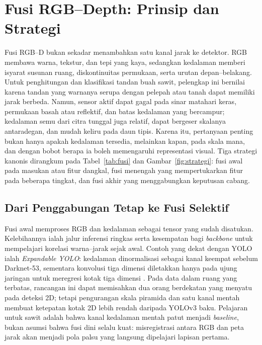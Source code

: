 
\section{Fusi RGB--Depth: Prinsip dan Strategi}\label{sec:fusi}
Fusi RGB--D bukan sekadar menambahkan satu kanal jarak ke detektor. RGB
membawa warna, tekstur, dan tepi yang kaya, sedangkan kedalaman memberi
isyarat susunan ruang, diskontinuitas permukaan, serta urutan depan--belakang.
Untuk penghitungan dan klasifikasi tandan buah sawit, pelengkap ini bernilai
karena tandan yang warnanya serupa dengan pelepah atau tanah dapat memiliki
jarak berbeda. Namun, sensor aktif dapat gagal pada sinar matahari keras,
permukaan basah atau reflektif, dan batas kedalaman yang bercampur; kedalaman
semu dari citra tunggal juga relatif, dapat bergeser skalanya antaradegan, dan
mudah keliru pada daun tipis. Karena itu, pertanyaan penting bukan hanya
apakah kedalaman tersedia, melainkan kapan, pada skala mana, dan dengan bobot
berapa ia boleh memengaruhi representasi visual. Tiga strategi kanonis
dirangkum pada Tabel~\ref{tab:fusi} dan Gambar~\ref{fig:strategi}: fusi awal
pada masukan atau fitur dangkal, fusi menengah yang mempertukarkan fitur pada
beberapa tingkat, dan fusi akhir yang menggabungkan keputusan cabang.

\subsection{Dari Penggabungan Tetap ke Fusi Selektif}

Fusi awal memproses RGB dan kedalaman sebagai tensor yang sudah disatukan.
Kelebihannya ialah jalur inferensi ringkas serta kesempatan bagi \textit{backbone}
untuk mempelajari korelasi warna--jarak sejak awal. Contoh yang dekat dengan
YOLO ialah \textit{Expandable YOLO}: kedalaman dinormalisasi sebagai kanal
keempat sebelum Darknet-53, sementara konvolusi tiga dimensi diletakkan hanya
pada ujung jaringan untuk meregresi kotak tiga dimensi \cite{takahashi2020expandableyolo}.
Pada data dalam ruang yang terbatas, rancangan ini dapat memisahkan dua orang
berdekatan yang menyatu pada deteksi 2D; tetapi pengurangan skala piramida dan
satu kanal mentah membuat ketepatan kotak 2D lebih rendah daripada YOLOv3
baku. Pelajaran untuk sawit adalah bahwa kanal kedalaman mentah patut menjadi
\textit{baseline}, bukan asumsi bahwa fusi dini selalu kuat: misregistrasi
antara RGB dan peta jarak akan menjadi pola palsu yang langsung dipelajari
lapisan pertama.


